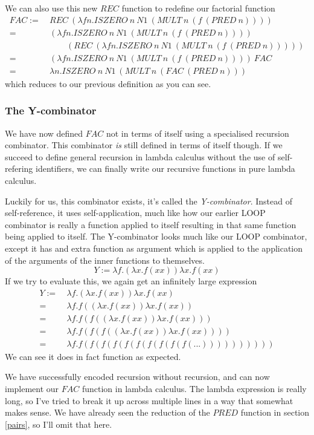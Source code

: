 \documentclass[11pt]{article}
\begin{document}
We can also use this new \(REC\) function to redefine our factorial function
\begin{align*}
	FAC:=\ &REC\ (\lambda fn.ISZERO\ n\ N1\ (MULT\ n\ (f\ (PRED\ n))))\\
	=\ &(\lambda fn.ISZERO\ n\ N1\ (MULT\ n\ (f\ (PRED\ n))))\\
	&\qquad(REC\ (\lambda fn.ISZERO\ n\ N1\ (MULT\ n\ (f\ (PRED\ n)))))\\
	=\ &(\lambda fn.ISZERO\ n\ N1\ (MULT\ n\ (f\ (PRED\ n))))\ FAC\\
	=\ &\lambda n.ISZERO\ n\ N1\ (MULT\ n\ (FAC\ (PRED\ n)))
\end{align*}
which reduces to our previous definition as you can see.

\subsubsection{The Y-combinator}

We have now defined \(FAC\) not in terms of itself using a specialised
recursion combinator. This combinator \emph{is} still defined in terms of
itself though. If we succeed to define general recursion in lambda calculus
without the use of self-refering identifiers, we can finally write our
recursive functions in pure lambda calculus.

Luckily for us, this combinator exists, it's called the \emph{Y-combinator}.
Instead of self-reference, it uses self-application, much like how our earlier
LOOP combinator is really a function applied to itself resulting in that same
function being applied to itself. The Y-combinator looks much like our LOOP
combinator, except it has and extra function as argument which is applied to
the application of the arguments of the inner functions to themselves.
\[Y:=\lambda f.(\lambda x.f(xx))\lambda x.f(xx)\]
If we try to evaluate this, we again get an infinitely large expression
\begin{align*}
	Y:=\ &\lambda f.(\lambda x.f(xx))\lambda x.f(xx)\\
	=\ &\lambda f.f((\lambda x.f(xx))\lambda x.f(xx))\\
	=\ &\lambda f.f(f((\lambda x.f(xx))\lambda x.f(xx)))\\
	=\ &\lambda f.f(f(f((\lambda x.f(xx))\lambda x.f(xx))))\\
	=\ &\lambda f.f(f(f(f(f(f(f(f(f(f(...))))))))))
\end{align*}
We can see it does in fact function as expected.

We have successfully encoded recursion without recursion, and can now implement
our \(FAC\) function in lambda calculus. The lambda expression is really long,
so I've tried to break it up across multiple lines in a way that somewhat makes
sense. We have already seen the reduction of the \(PRED\) function in section
\ref{pairs}, so I'll omit that here.
\end{document}
